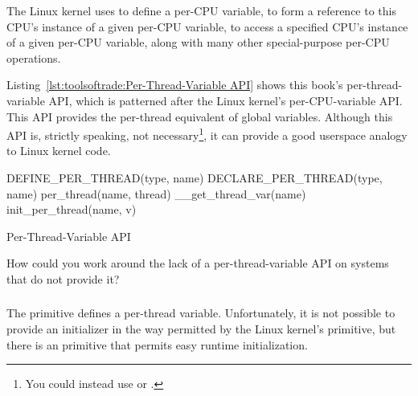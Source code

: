 The Linux kernel uses  to define a per-CPU variable,
 to form a reference to this CPU's instance of a
given per-CPU variable,  to access a specified CPU's
instance of a given per-CPU variable, along with many other special-purpose
per-CPU operations.

Listing~\ref{lst:toolsoftrade:Per-Thread-Variable API}
shows this book's per-thread-variable API, which is patterned
after the Linux kernel's per-CPU-variable API.
This API provides the per-thread equivalent of global variables.
Although this API is, strictly speaking, not necessary\footnote{
	You could instead use  or .},
it can provide a good userspace analogy to Linux kernel code.

\begin{listing}[htbp]
{ \scriptsize
\begin{verbbox}
DEFINE_PER_THREAD(type, name)
DECLARE_PER_THREAD(type, name)
per_thread(name, thread)
__get_thread_var(name)
init_per_thread(name, v)
\end{verbbox}
}
\centering
\theverbbox
\caption{Per-Thread-Variable API}
\label{lst:toolsoftrade:Per-Thread-Variable API}
\end{listing}

\QuickQuiz{}
	How could you work around the lack of a per-thread-variable
	API on systems that do not provide it?
 \QuickQuizEnd

\subsubsection{}

The  primitive defines a per-thread variable.
Unfortunately, it is not possible to provide an initializer in the way
permitted by the Linux kernel's  primitive,
but there is an  primitive that permits easy
runtime initialization.

